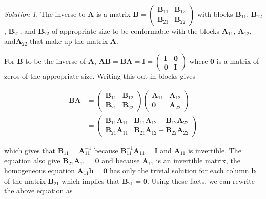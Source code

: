 \documentclass[
]{book}
\theoremstyle{definition}
\theoremstyle{definition}
\theoremstyle{definition}
\theoremstyle{definition}
\theoremstyle{remark}
\newtheorem*{solution}{Solution}
\begin{document}
\begin{solution}
The inverse to \(\mathbf{A}\) is a matrix \(\mathbf{B} = \begin{pmatrix} \mathbf{B}_{11} & \mathbf{B}_{12} \\ \mathbf{B}_{21} & \mathbf{B}_{22} \end{pmatrix}\) with blocks \(\mathbf{B}_{11}\), \(\mathbf{B}_{12}\), \(\mathbf{B}_{21}\), and \(\mathbf{B}_{22}\) of appropriate size to be conformable with the blocks \(\mathbf{A}_{11}\), \(\mathbf{A}_{12}\), and\(\mathbf{A}_{22}\) that make up the matrix \(\mathbf{A}\).

For \(\mathbf{B}\) to be the inverse of \(\mathbf{A}\), \(\mathbf{A}\mathbf{B} = \mathbf{B}\mathbf{A} = \mathbf{I} = \begin{pmatrix} \mathbf{I} & \mathbf{0} \\ \mathbf{0} & \mathbf{I} \end{pmatrix}\) where \(\mathbf{0}\) is a matrix of zeros of the appropriate size. Writing this out in blocks gives

\[
\begin{aligned}
\mathbf{B}\mathbf{A} & = \begin{pmatrix} \mathbf{B}_{11} & \mathbf{B}_{12} \\ \mathbf{B}_{21} & \mathbf{B}_{22} \end{pmatrix}  \begin{pmatrix} \mathbf{A}_{11} & \mathbf{A}_{12} \\ \mathbf{0} & \mathbf{A}_{22} \end{pmatrix} \\
& = \begin{pmatrix} \mathbf{B}_{11} \mathbf{A}_{11} & \mathbf{B}_{11} \mathbf{A}_{12} + \mathbf{B}_{12} \mathbf{A}_{22} \\ \mathbf{B}_{21} \mathbf{A}_{11} & \mathbf{B}_{21} \mathbf{A}_{12} + \mathbf{B}_{22} \mathbf{A}_{22}\end{pmatrix}
\end{aligned}
\]

which gives that \(\mathbf{B}_{11} = \mathbf{A}_{11}^{-1}\) because \(\mathbf{B}_{11}^{-1}\mathbf{A}_{11} = \mathbf{I}\) and \(\mathbf{A}_{11}\) is invertible. The equation also give \(\mathbf{B}_{21} \mathbf{A}_{11} = \mathbf{0}\) and because \(\mathbf{A}_{11}\) is an invertible matrix, the homogeneous equation \(\mathbf{A}_{11}\mathbf{b} = \mathbf{0}\) has only the trivial solution for each column \(\mathbf{b}\) of the matrix \(\mathbf{B}_{21}\) which implies that \(\mathbf{B}_{21} = \mathbf{0}\). Using these facts, we can rewrite the above equation as


\end{solution}
\end{document}
